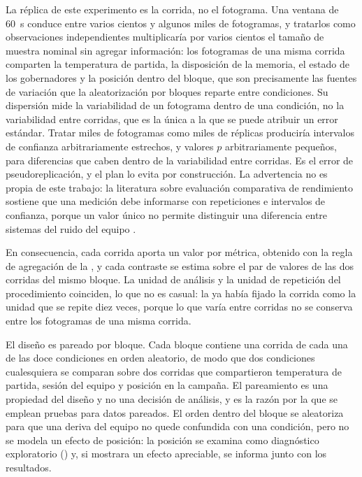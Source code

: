 La réplica de este experimento es la corrida, no el fotograma. Una ventana de
60~s conduce entre varios cientos y algunos miles de fotogramas, y tratarlos
como observaciones independientes multiplicaría por varios cientos el tamaño
de muestra nominal sin agregar información: los fotogramas de una
misma corrida comparten la temperatura de partida, la disposición de la
memoria, el estado de los gobernadores y la posición dentro del bloque, que
son precisamente las fuentes de variación que la aleatorización por bloques
reparte entre condiciones. Su dispersión mide la variabilidad de un fotograma
dentro de una condición, no la variabilidad entre corridas, que es la única a
la que se puede atribuir un error estándar. Tratar miles de fotogramas como
miles de réplicas produciría intervalos de confianza arbitrariamente
estrechos, y valores $p$ arbitrariamente pequeños, para diferencias que caben
dentro de la variabilidad entre corridas. Es el error de pseudoreplicación, y
el plan lo evita por construcción. La advertencia no es propia de este trabajo:
la literatura sobre evaluación comparativa de rendimiento sostiene que una
medición debe informarse con repeticiones e intervalos de confianza, porque un
valor único no permite distinguir una diferencia entre sistemas del ruido del
equipo \cite{hoefler2015, georges2007}.

En consecuencia, cada corrida aporta un valor por métrica, obtenido con la
regla de agregación de la , y cada contraste
se estima sobre el par de valores de las dos corridas del mismo bloque. La
unidad de análisis y la unidad de repetición del procedimiento coinciden, lo
que no es casual: la  ya había fijado la corrida como
la unidad que se repite diez veces, porque lo que varía entre corridas no se
conserva entre los fotogramas de una misma corrida.

El diseño es pareado por bloque. Cada bloque contiene una corrida de cada una
de las doce condiciones en orden aleatorio, de modo que dos condiciones
cualesquiera se comparan sobre dos corridas que compartieron temperatura de
partida, sesión del equipo y posición en la campaña. El pareamiento es una
propiedad del diseño y no una decisión de análisis, y es la razón por la que
se emplean pruebas para datos pareados. El orden dentro del bloque se
aleatoriza para que una deriva del equipo no quede confundida con una
condición, pero no se modela un efecto de posición: la posición se examina
como diagnóstico exploratorio () y, si mostrara un
efecto apreciable, se informa junto con los resultados.


